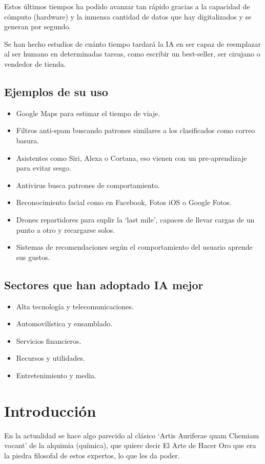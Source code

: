 \documentclass[12pt, twoside, openright]{report} %
\begin{document}
Estos últimos tiempos ha podido avanzar tan rápido gracias a la capacidad de cómputo (hardware) y la inmensa cantidad de datos que hay digitalizados y se generan por segundo.

Se han hecho estudios de cuánto tiempo tardará la IA en ser capaz de reemplazar al ser humano en determinadas tareas, como escribir un best-seller, ser cirujano o vendedor de tienda.

\subsection{Ejemplos de su uso}
\begin{itemize}
	\item Google Maps para estimar el tiempo de viaje.
	\item Filtros anti-spam buscando patrones similares a los clasificados como correo basura.
	\item Asistentes como Siri, Alexa o Cortana, eso vienen con un pre-aprendizaje para evitar sesgo.
	\item Antivirus busca patrones de comportamiento.
	\item Reconocimiento facial como en Facebook, Fotos iOS o Google Fotos.
	\item Drones repartidores para suplir la ‘last mile’, capaces de llevar cargas de un punto a otro y recargarse solos.
	\item Sistemas de recomendaciones según el comportamiento del usuario aprende sus gustos.
\end{itemize}

\subsection{Sectores que han adoptado IA mejor}
\begin{itemize}
	\item Alta tecnología y telecomunicaciones.
	\item Automovilística y ensamblado.
	\item Servicios financieros.
	\item Recursos y utilidades.
	\item Entretenimiento y media.
\end{itemize}

\section{Introducción}
En la actualidad se hace algo parecido al clásico ‘Artis Auriferae quam Chemiam vocant’ de la alquimia (química), que quiere decir El Arte de Hacer Oro que era la piedra filosofal de estos expertos, lo que les da poder.
\end{document}
